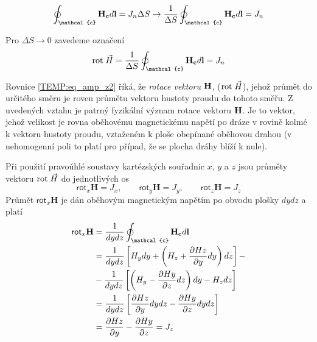 {      \begin{equation}\label{TEMP:eq_amp_z1}
        \oint_\mathcal{c}\vr{H_c}d\vr{l}  =
           J_n \Delta S \rightarrow \frac{1}{\Delta S}\oint_\mathcal{c}\vr{H_c}d\vr{l} = J_n
      \end{equation} 
      
      Pro $\Delta S \rightarrow 0$ zavedeme označení 
      \begin{equation}\label{TEMP:eq_amp_z2}
        \rot{H}  = \frac{1}{\Delta S}\oint_\mathcal{c}\vr{H_c}d\vr{l}  = J_n
      \end{equation}
      
      Rovnice \ref{TEMP:eq_amp_z2} říká, že \emph{rotace vektoru} $\mathbf{H}$, ($\mathrm{rot}\;\vec{H}$), jehož
      průmět do určitého směru je roven průmětu vektoru hustoty proudu do tohoto směřu. Z uvedených
      vztahu je patrný fyzikální význam rotace vektoru $\mathbf{H}$. Je to vektor, jehož velikost je
      rovna oběhovému magnetickému napětí po dráze v rovině kolmé k vektoru hustoty proudu,
      vztaženém k ploše obepínané oběhovou drahou (v nehomogenní poli to platí pro případ, že se
      plocha dráhy blíží k nule).
      
      Při použití pravoúhlé soustavy kartézských souřadnic $x$, $y$ a $z$ jsou průměty vektoru
      $\mathrm{rot}\;\vec{H}$ do jednotlivých os
      \begin{equation}\label{TEMP:eq_amp_z3}
        \textsf{rot}_x\mathbf{H} = J_x, \qquad 
        \textsf{rot}_y\mathbf{H} = J_y, \qquad
        \textsf{rot}_z\mathbf{H} = J_z
      \end{equation}      
      Průmět $\textsf{rot}_x\mathbf{H}$ je dán oběhovým magnetickým napětím po obvodu plošky $dydz$
      a platí
      \begin{align}\label{TEMP:eq_amp_z4}
        \textsf{rot}_x\mathbf{H} 
          &= \frac{1}{dydz}\oint_\mathcal{c}\vr{H_c}d\vr{l}                   \nonumber \\
          &= \frac{1}{dydz}\left[H_ydy + 
                           \left(H_z + \pder{Hz}{y}dy\right)dz\right] -       \nonumber \\
          &- \frac{1}{dydz}\left[\left(H_y - 
                           \pder{Hy}{z}dz\right)dy - H_zdz\right]             \nonumber \\
          &= \frac{1}{dydz}\left[\pder{Hz}{y}dydz - \pder{Hy}{z}dydz\right]   \nonumber \\
          &= \pder{Hz}{y} - \pder{Hy}{z} = J_z
      \end{align}       
      
}
